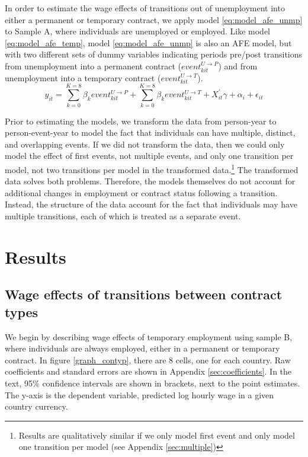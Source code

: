 \documentclass[12pt]{article}
\begin{document}
In order to estimate the wage effects of transitions out of unemployment into either a permanent or temporary contract, we apply model \ref{eq:model_afe_unmp} to Sample A, where individuals are unemployed or employed.   Like model \ref{eq:model_afe_temp}, model \ref{eq:model_afe_unmp} is also an AFE model, but with two different sets of dummy variables indicating periods pre/post transitions from unemployment into a permanent contract ($event^{U \rightarrow P}_{kit}$) and from unemployment into a temporary contract ($event^{U \rightarrow T}_{kit}$).  
\begin{equation}
    y_{it} = \sum^{K=8}_{k=0} \beta_k event^{U \rightarrow P}_{kit} + \sum^{K=8}_{k=0} \beta_k event^{U \rightarrow T}_{kit} + X^\prime_{it} \gamma + \alpha_i + \epsilon_{it}     
    \label{eq:model_afe_unmp}
\end{equation}

Prior to estimating the models, we transform the data from person-year to person-event-year to model the fact that individuals can have multiple, distinct, and overlapping events.  If we did not transform the data, then we could only model the effect of first events, not multiple events, and only one transition per model, not two transitions per model in the transformed data.\footnote{Results are qualitatively similar if we only model first event and only model one transition per model (see Appendix \ref{sec:multiple})}  The transformed data solves both problems.  Therefore, the models themselves do not account for additional changes in employment or contract status following a transition.  Instead, the structure of the data account for the fact that individuals may have multiple transitions, each of which is treated as a separate event.

\section{Results}

\subsection{Wage effects of transitions between contract types}

We begin by describing wage effects of temporary employment using sample B, where individuals are always employed, either in a permanent or temporary contract.  In figure \ref{graph_contyp}, there are 8 cells, one for each country.  Raw coefficients and standard errors are shown in Appendix \ref{sec:coefficients}.  In the text, 95\% confidence intervals are shown in brackets, next to the point estimates.  The y-axis is the dependent variable, predicted log hourly wage in a given country currency.  
\end{document}

